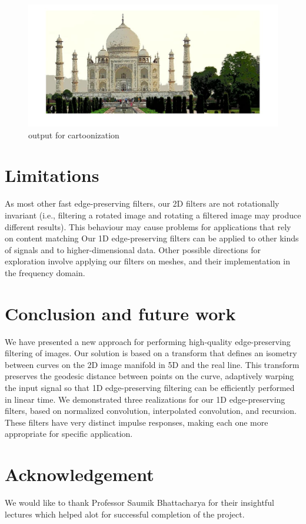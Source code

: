 \documentclass[conference]{IEEEtran}
\begin{document}
  \begin{figure}
 	\includegraphics[width = \linewidth]{taj_out.jpg}
 	\caption{output for cartoonization}
 	\label{fig:outputCartoon}
 \end{figure}
 
 \section{Limitations}
 As most other fast edge-preserving filters, our 2D filters are not rotationally invariant (i.e., filtering a rotated image and rotating a filtered image may produce different results). This behaviour may cause problems for applications that rely on content matching
Our 1D edge-preserving filters can be applied to other kinds of signals and to higher-dimensional data. Other possible directions for exploration involve applying our filters on meshes, and their implementation in the frequency domain.

 
 \section{Conclusion and future work}
We have presented a new approach for performing high-quality edge-preserving filtering of images. Our solution is based on a transform that defines an isometry between curves on the 2D image manifold in 5D and the real line. This transform preserves the geodesic distance between points on the curve, adaptively warping the input signal so that 1D edge-preserving filtering can be efficiently performed in linear time. We demonstrated three realizations for our 1D edge-preserving filters, based on normalized convolution, interpolated convolution, and recursion. These filters have very distinct impulse responses, making each one more appropriate for specific application.

\section{Acknowledgement}
We would like to thank Professor Saumik Bhattacharya for their insightful lectures which helped alot for successful completion of the project. 
\end{document}
